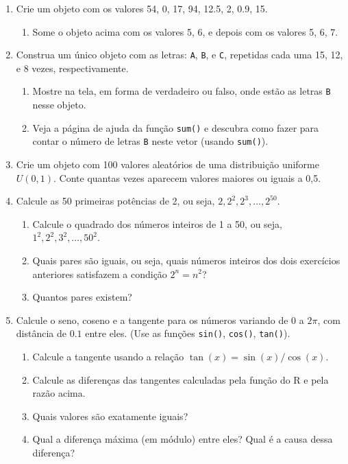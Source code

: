 \documentclass[
  10pt,
  a4paper]{book}
\providecommand{\tightlist}{%
  \setlength{\itemsep}{0pt}\setlength{\parskip}{0pt}}
\begin{document}
\begin{enumerate}
\def\labelenumi{\arabic{enumi}.}
\tightlist
\item
  Crie um objeto com os valores 54, 0, 17, 94, 12.5, 2, 0.9, 15.

  \begin{enumerate}
  \def\labelenumii{\alph{enumii}.}
  \tightlist
  \item
    Some o objeto acima com os valores 5, 6, e depois com os valores 5,
    6, 7.
  \end{enumerate}
\item
  Construa um único objeto com as letras: \texttt{A}, \texttt{B}, e \texttt{C}, repetidas
  cada uma 15, 12, e 8 vezes, respectivamente.

  \begin{enumerate}
  \def\labelenumii{\alph{enumii}.}
  \tightlist
  \item
    Mostre na tela, em forma de verdadeiro ou falso, onde estão as letras
    \texttt{B} nesse objeto.
  \item
    Veja a página de ajuda da função \texttt{sum()} e descubra como fazer para
    contar o número de letras \texttt{B} neste vetor (usando \texttt{sum()}).
  \end{enumerate}
\item
  Crie um objeto com 100 valores aleatórios de uma distribuição uniforme
  \(U(0,1)\). Conte quantas vezes aparecem valores maiores ou iguais a 0,5.
\item
  Calcule as 50 primeiras potências de 2, ou seja, \(2, 2^2, 2^3, \ldots, 2^{50}\).

  \begin{enumerate}
  \def\labelenumii{\alph{enumii}.}
  \tightlist
  \item
    Calcule o quadrado dos números inteiros de 1 a 50, ou seja, \(1^2,  2^2, 3^2, \ldots, 50^2\).
  \item
    Quais pares são iguais, ou seja, quais números inteiros dos dois
    exercícios anteriores satisfazem a condição \(2^n = n^2\)?
  \item
    Quantos pares existem?
  \end{enumerate}
\item
  Calcule o seno, coseno e a tangente para os números variando de \(0\) a
  \(2\pi\), com distância de \(0.1\) entre eles. (Use as funções \texttt{sin()},
  \texttt{cos()}, \texttt{tan()}).

  \begin{enumerate}
  \def\labelenumii{\alph{enumii}.}
  \tightlist
  \item
    Calcule a tangente usando a relação \(\tan(x) = \sin(x)/\cos(x)\).
  \item
    Calcule as diferenças das tangentes calculadas pela função do R e
    pela razão acima.
  \item
    Quais valores são exatamente iguais?
  \item
    Qual a diferença máxima (em módulo) entre eles? Qual é a causa
    dessa diferença?
  \end{enumerate}
\end{enumerate}
\end{document}
